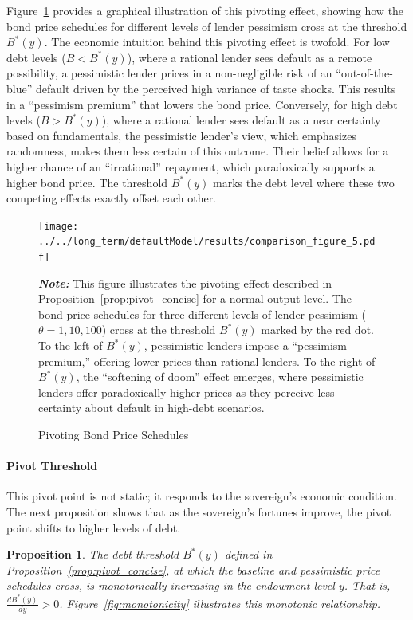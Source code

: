\documentclass[12pt]{article}
\theoremstyle{plain}
\newtheorem{proposition}{Proposition}
\begin{document}
Figure~\ref{fig:pivoting_proof} provides a graphical illustration of this
pivoting effect, showing how the bond price schedules for different levels of
lender pessimism cross at the threshold $B^*(y)$. The economic intuition behind
this pivoting effect is twofold. For low debt levels ($B<B^*(y)$), where a
rational lender sees default as a remote possibility, a pessimistic lender
prices in a non-negligible risk of an ``out-of-the-blue'' default driven by the
perceived high variance of taste shocks. This results in a ``pessimism
premium'' that lowers the bond price. Conversely, for high debt levels
($B>B^*(y)$), where a rational lender sees default as a near certainty based on
fundamentals, the pessimistic lender's view, which emphasizes randomness, makes
them less certain of this outcome. Their belief allows for a higher chance of
an ``irrational'' repayment, which paradoxically supports a higher bond price.
The threshold $B^*(y)$ marks the debt level where these two competing effects
exactly offset each other.

\begin{figure}[htb]
	\centering
	\texttt{[image: ../../long\_term/defaultModel/results/comparison\_figure\_5.pdf]}
	\caption{Pivoting Bond Price Schedules}\label{fig:pivoting_proof}

	\parbox{\textwidth}{\small\textit{\textbf{Note:} }This figure illustrates the pivoting effect described in Proposition~\ref{prop:pivot_concise} for a normal output level. The bond price schedules for three different levels of lender pessimism ($\theta = 1, 10, 100$) cross at the threshold $B^*(y)$ marked by the red dot. To the left of $B^*(y)$, pessimistic lenders impose a ``pessimism premium,'' offering lower prices than rational lenders. To the right of $B^*(y)$, the ``softening of doom'' effect emerges, where pessimistic lenders offer paradoxically higher prices as they perceive less certainty about default in high-debt scenarios.}
\end{figure}

\paragraph{Pivot Threshold}This pivot point is not static; it responds to the sovereign's economic
condition. The next proposition shows that as the sovereign's fortunes improve,
the pivot point shifts to higher levels of debt.

\begin{proposition}
	\label{prop:monotonicity}
	The debt threshold $B^*(y)$ defined in Proposition~\ref{prop:pivot_concise}, at which the baseline and pessimistic price schedules cross, is monotonically increasing in the endowment level $y$. That is, $\frac{dB^*(y)}{dy} > 0$. Figure~\ref{fig:monotonicity} illustrates this monotonic relationship.
\end{proposition}
\end{document}
